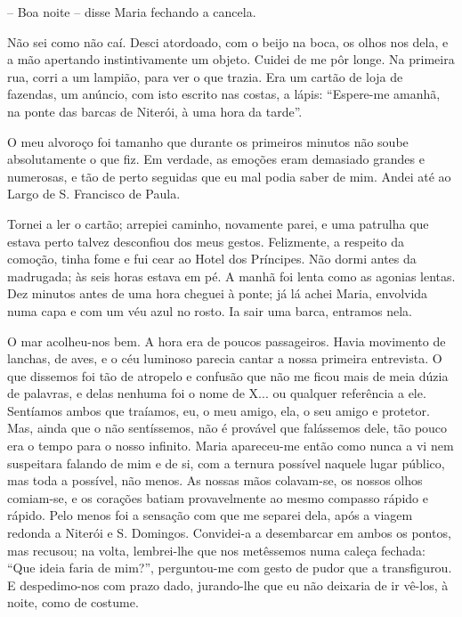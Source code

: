 -- Boa noite -- disse Maria fechando a cancela.

Não sei como não caí. Desci atordoado, com o beijo na boca, os olhos nos
dela, e a mão apertando instintivamente um objeto. Cuidei de me pôr
longe. Na primeira rua, corri a um lampião, para ver o que trazia. Era
um cartão de loja de fazendas, um anúncio, com isto escrito nas costas,
a lápis: ``Espere-me amanhã, na ponte das barcas de Niterói, à uma hora
da tarde''.

O meu alvoroço foi tamanho que durante os primeiros minutos não soube
absolutamente o que fiz. Em verdade, as emoções eram demasiado grandes e
numerosas, e tão de perto seguidas que eu mal podia saber de mim. Andei
até ao Largo de S. Francisco de Paula.

Tornei a ler o cartão; arrepiei caminho, novamente parei, e uma patrulha
que estava perto talvez desconfiou dos meus gestos. Felizmente, a
respeito da comoção, tinha fome e fui cear ao Hotel dos Príncipes. Não
dormi antes da madrugada; às seis horas estava em pé. A manhã foi lenta
como as agonias lentas. Dez minutos antes de uma hora cheguei à ponte;
já lá achei Maria, envolvida numa capa e com um véu azul no rosto. Ia
sair uma barca, entramos nela.

O mar acolheu-nos bem. A hora era de poucos passageiros. Havia movimento
de lanchas, de aves, e o céu luminoso parecia cantar a nossa primeira
entrevista. O que dissemos foi tão de atropelo e confusão que não me
ficou mais de meia dúzia de palavras, e delas nenhuma foi o nome de X...
ou qualquer referência a ele. Sentíamos ambos que traíamos, eu, o meu
amigo, ela, o seu amigo e protetor. Mas, ainda que o não sentíssemos,
não é provável que falássemos dele, tão pouco era o tempo para o nosso
infinito. Maria apareceu-me então como nunca a vi nem suspeitara falando
de mim e de si, com a ternura possível naquele lugar público, mas toda a
possível, não menos. As nossas mãos colavam-se, os nossos olhos
comiam-se, e os corações batiam provavelmente ao mesmo compasso rápido e
rápido. Pelo menos foi a sensação com que me separei dela, após a viagem
redonda a Niterói e S. Domingos. Convidei-a a desembarcar em ambos os
pontos, mas recusou; na volta, lembrei-lhe que nos metêssemos numa
caleça fechada: ``Que ideia faria de mim?'', perguntou-me com gesto de
pudor que a transfigurou. E despedimo-nos com prazo dado, jurando-lhe
que eu não deixaria de ir vê-los, à noite, como de costume.

